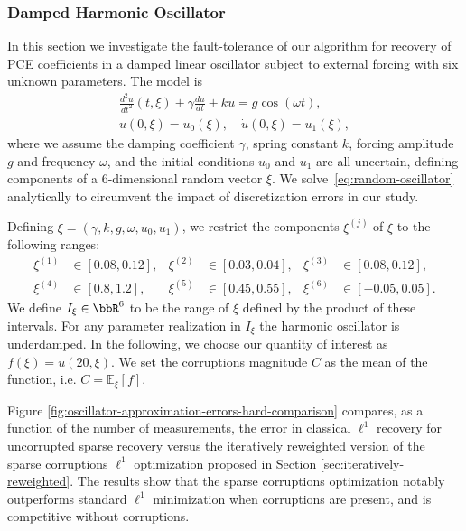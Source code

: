\subsubsection{Damped Harmonic Oscillator}
In this section we investigate the fault-tolerance of our algorithm for recovery of PCE coefficients in a damped linear oscillator subject to external forcing with six unknown parameters. The model is
\begin{align}\label{eq:random-oscillator}
\frac{d^2u}{dt^2}(t,\xi)+\gamma\frac{du}{dt}+k u=g\cos(\omega t),\\\nonumber
u(0,\xi)=u_0(\xi),\quad \dot{u}(0,\xi)=u_1(\xi),
\end{align}
where we assume the damping coefficient $\gamma$, spring constant $k$,
forcing amplitude $g$ and frequency $\omega$, and the initial
conditions $u_0$ and $u_1$ are all uncertain, defining components of a 6-dimensional random vector $\xi$. We solve~\eqref{eq:random-oscillator} analytically to circumvent the impact of discretization errors in our study.

Defining $\xi=(\gamma,k,g,\omega,u_0,u_1)$, we restrict the components $\xi^{(j)}$ of $\xi$ to the following ranges:
\begin{align*}
  \xi^{(1)} &\in [0.08,0.12], & \xi^{(2)} &\in [0.03,0.04], & \xi^{(3)} &\in [0.08,0.12], \\
  \xi^{(4)} &\in [0.8,1.2], & \xi^{(5)} &\in [0.45,0.55], & \xi^{(6)} &\in [-0.05,0.05].
\end{align*}
We define $I_\xi \in \bbR^6$ to be the range of $\xi$ defined by the product of these intervals. For any parameter realization in $I_\xi$ the harmonic oscillator is underdamped. In the following, we choose our quantity of interest as $f(\xi) = u(20,\xi)$. We set the corruptions magnitude $C$ as the mean of the function, i.e. $C = \mathbb{E}_\xi[f]$.

Figure \ref{fig:oscillator-approximation-errors-hard-comparison} compares, as a function of the number of measurements, the error in classical $\ell^1$ recovery for uncorrupted sparse recovery versus the iteratively reweighted version of the sparse corruptions $\ell^1$ optimization proposed in Section \ref{sec:iteratively-reweighted}. The results show that the sparse corruptions optimization notably outperforms standard $\ell^1$ minimization when corruptions are present, and is competitive without corruptions.


